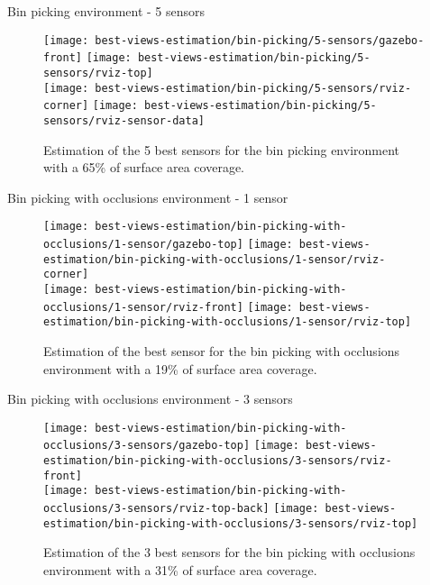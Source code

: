\begin{frame}{Bin picking environment - 5 sensors}
	\begin{figure}
		\centering
		\texttt{[image: best-views-estimation/bin-picking/5-sensors/gazebo-front]}\hspace{2em}
		\texttt{[image: best-views-estimation/bin-picking/5-sensors/rviz-top]}\\
		\texttt{[image: best-views-estimation/bin-picking/5-sensors/rviz-corner]}\hspace{2em}
		\texttt{[image: best-views-estimation/bin-picking/5-sensors/rviz-sensor-data]}
		\caption{Estimation of the 5 best sensors for the bin picking environment with a 65\% of surface area coverage.}
	\end{figure}
\end{frame}


\begin{frame}{Bin picking with occlusions environment - 1 sensor}
	\begin{figure}
		\centering
		\texttt{[image: best-views-estimation/bin-picking-with-occlusions/1-sensor/gazebo-top]}\hspace{2em}
		\texttt{[image: best-views-estimation/bin-picking-with-occlusions/1-sensor/rviz-corner]}\\
		\texttt{[image: best-views-estimation/bin-picking-with-occlusions/1-sensor/rviz-front]}\hspace{4em}
		\texttt{[image: best-views-estimation/bin-picking-with-occlusions/1-sensor/rviz-top]}
		\caption{Estimation of the best sensor for the bin picking with occlusions environment with a 19\% of surface area coverage.}
	\end{figure}
\end{frame}


\begin{frame}{Bin picking with occlusions environment - 3 sensors}
	\begin{figure}
		\centering
		\texttt{[image: best-views-estimation/bin-picking-with-occlusions/3-sensors/gazebo-top]}\hspace{2em}
		\texttt{[image: best-views-estimation/bin-picking-with-occlusions/3-sensors/rviz-front]}\\
		\texttt{[image: best-views-estimation/bin-picking-with-occlusions/3-sensors/rviz-top-back]}\hspace{4em}
		\texttt{[image: best-views-estimation/bin-picking-with-occlusions/3-sensors/rviz-top]}
		\caption{Estimation of the 3 best sensors for the bin picking with occlusions environment with a 31\% of surface area coverage.}
	\end{figure}
\end{frame}


